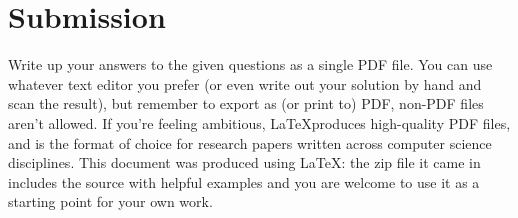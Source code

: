 \documentclass{article} %
\begin{document}
\section*{Submission}
Write up your answers to the given questions as a single PDF file. You can use whatever text editor you prefer (or even write out your solution by hand and scan the result), but remember to export as (or print to) PDF, non-PDF files aren't allowed. If you're feeling ambitious, \LaTeX produces high-quality PDF files, and is the format of choice for research papers written across computer science disciplines. This document was produced using \LaTeX: the zip file it came in includes the source with helpful examples and you are welcome to use it as a starting point for your own work.
\end{document}

